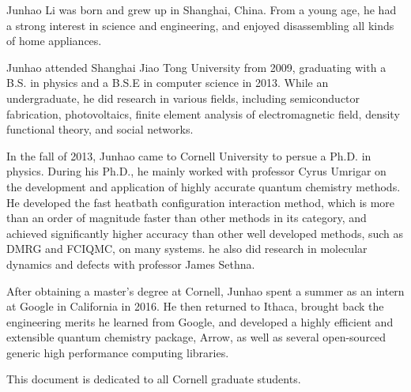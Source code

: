 \documentclass[phd,tocprelim]{cornell}
\begin{document}
\begin{biosketch}
Junhao Li was born and grew up in Shanghai, China.
From a young age, he had a strong interest in science and engineering, and enjoyed disassembling all kinds of home appliances.

Junhao attended Shanghai Jiao Tong University from 2009, graduating with a B.S. in physics and a B.S.E in computer science in 2013.
While an undergraduate, he did research in various fields, including semiconductor fabrication, photovoltaics, finite element analysis of electromagnetic field, density functional theory, and social networks.

In the fall of 2013, Junhao came to Cornell University to persue a Ph.D. in physics.
During his Ph.D., he mainly worked with professor Cyrus Umrigar on the development and application of highly accurate quantum chemistry methods.
He developed the fast heatbath configuration interaction method, which is more than an order of magnitude faster than other methods in its category, and achieved significantly higher accuracy than other well developed methods, such as DMRG and FCIQMC, on many systems.
he also did research in molecular dynamics and defects with professor James Sethna.

After obtaining a master's degree at Cornell, Junhao spent a summer as an intern at Google in California in 2016.
He then returned to Ithaca, brought back the engineering merits he learned from Google, and developed a highly efficient and extensible quantum chemistry package, Arrow, as well as several open-sourced generic high performance computing libraries.
\end{biosketch}

\begin{dedication}
This document is dedicated to all Cornell graduate students.
\end{dedication}
\end{document}
